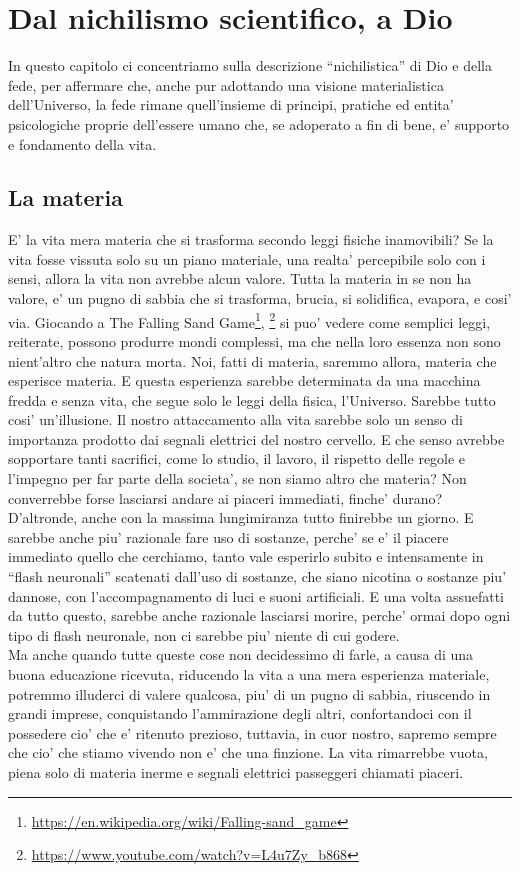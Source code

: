 \section{Dal nichilismo scientifico, a Dio}
\label{nichilismoScientifico}
In questo capitolo ci concentriamo sulla descrizione ``nichilistica'' di Dio e della fede, per affermare che, anche pur adottando una visione materialistica dell'Universo, la fede rimane quell'insieme di principi, pratiche ed entita' psicologiche proprie dell'essere umano che, se adoperato a fin di bene, e' supporto e fondamento della vita.

\subsection{La materia}

E' la vita mera materia che si trasforma secondo leggi fisiche inamovibili? Se la vita fosse vissuta solo su un piano materiale, una realta' percepibile solo con i sensi, allora la vita non avrebbe alcun valore.
Tutta la materia in se non ha valore, e' un pugno di sabbia che si trasforma, brucia, si solidifica, evapora, e cosi' via. Giocando a The Falling Sand Game\footnote{\url{https://en.wikipedia.org/wiki/Falling-sand_game}}, \footnote{\url{https://www.youtube.com/watch?v=L4u7Zy_b868}} si puo' vedere come semplici leggi, reiterate, possono produrre mondi complessi, ma che nella loro essenza non sono nient'altro che natura morta. Noi, fatti di materia, saremmo allora, materia che esperisce materia. E questa esperienza sarebbe determinata da una macchina fredda e senza vita, che segue solo le leggi della fisica, l'Universo.
Sarebbe tutto cosi' un'illusione. Il nostro attaccamento alla vita sarebbe solo un senso di importanza prodotto dai segnali elettrici del nostro cervello. E che senso avrebbe sopportare tanti sacrifici, come lo studio, il lavoro, il rispetto delle regole e l'impegno per far parte della societa', se non siamo altro che materia? Non converrebbe forse lasciarsi andare ai piaceri immediati, finche' durano? D'altronde, anche con la massima lungimiranza tutto finirebbe un giorno. E sarebbe anche piu' razionale fare uso di sostanze, perche' se e' il piacere immediato quello che cerchiamo, tanto vale esperirlo subito e intensamente in ``flash neuronali'' scatenati dall'uso di sostanze, che siano nicotina o sostanze piu' dannose, con l'accompagnamento di luci e suoni artificiali. E una volta assuefatti da tutto questo, sarebbe anche razionale lasciarsi morire, perche' ormai dopo ogni tipo di flash neuronale, non ci sarebbe piu' niente di cui godere.\\
Ma anche quando tutte queste cose non decidessimo di farle, a causa di una buona educazione ricevuta, riducendo la vita a una mera esperienza materiale, potremmo illuderci di valere qualcosa, piu' di un pugno di sabbia, riuscendo in grandi imprese, conquistando l'ammirazione degli altri, confortandoci con il possedere cio' che e' ritenuto prezioso, tuttavia, in cuor nostro, sapremo sempre che cio' che stiamo vivendo non e' che una finzione. La vita rimarrebbe vuota, piena solo di materia inerme e segnali elettrici passeggeri chiamati piaceri.

